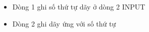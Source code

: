 \begin{itemize}
	\item Dòng 1 ghi số thứ tự dãy ở dòng 2 INPUT
	\item Dòng 2 ghi dãy ứng với số thứ tự
\end{itemize}

 

\